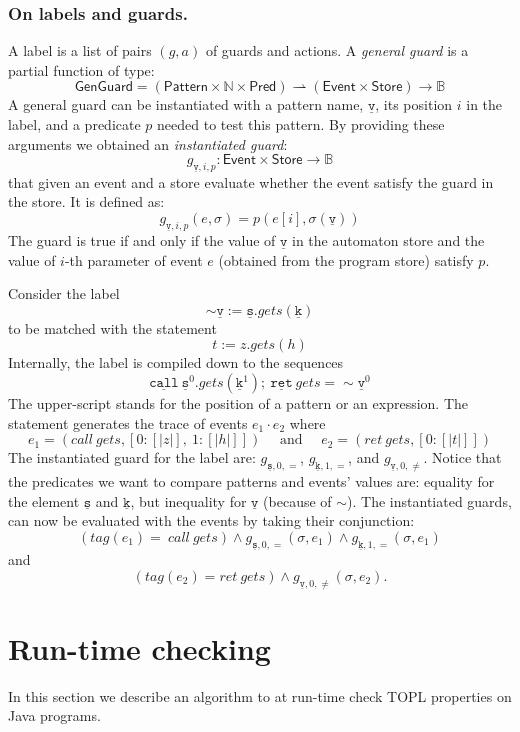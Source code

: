 \documentclass{llncs} %
\newcommand{\B}{\ensuremath{\mathbb{B}}}
\newcommand{\N}{\ensuremath{\mathbb{N}}}
\newcommand{\pattern}[1]{\ensuremath{\mathtt{\underline{#1}}}}
\newcommand{\pmap}{\rightharpoonup}
\newcommand{\set}[1]{\ensuremath{\mathsf{#1}}}
\begin{document}
\subsubsection{On labels and guards.}
 A label is a list of pairs $(g,a)$ of guards and actions. A  {\em general guard} is a partial function of type:
\[
\set{GenGuard} = (\set{Pattern} \times \N \times \set{Pred}) \pmap (\set{Event}\times\set{Store}) \to \B
\]
A general guard can be instantiated with a pattern  name, $\pattern v$,  its position $i$ in the label, and a predicate $p$ needed to test this pattern. By providing these arguments we obtained an {\em instantiated guard}:
\[
g_{\pattern{v},i,p} : \set{Event}\times\set{Store} \to \B
\]
that given an event and a store evaluate whether the event satisfy the guard in the store. It is defined as:
\newcommand{\sem}[1]{[ \! | #1 | \! ]}
\[
g_{\pattern{v},i,p}(e, \sigma) = p(e[i],\sigma(\pattern v))
\] The guard is true if and only if the value of $\pattern{v}$ in the automaton store 
and the value of $i$-th parameter of  event $e$ (obtained from the program store) satisfy $p$.
\begin{example}
Consider the label 
\[
 \sim \pattern {v} := \pattern {s}.gets(\pattern {k})
 \] to be matched with the statement 
\[
 t:=z.gets(h)
\] Internally,  the label is compiled down to the sequences 
\[
\pattern{call} \  \pattern{s}^0 .gets(\pattern {k}^1);  \ \pattern{ret} \ gets = \sim \pattern {v}^0   
\] The upper-script stands for the position of a pattern or an expression. The statement generates the trace of events $e_1 \cdot e_2$ where 
\[ 
 e_1=(call \ gets, [0: \sem{z}, \ 1: \sem{h}])  \quad \mbox{ and }  \quad e_2= (ret \ gets, [0: \sem{t}])
\] 
The instantiated guard for the label are:
 $g_{\pattern{s},0,=}$, $g_{\pattern{k},1,=}$, and  $g_{\pattern{v},0, \neq}$.  
Notice that the predicates we want to compare patterns and events' values are: equality for the element $\pattern{s}$ and $\pattern{k}$, 
but inequality for \pattern{v} (because of $\sim$).
The instantiated guards, can now be evaluated with the events by taking their conjunction:
\[ 
 (tag(e_1)= \ call \ gets) \wedge g_{\pattern{s},0,=}(\sigma,e_1) \wedge g_{\pattern{k},1,=}(\sigma, e_1) 
\] and 
\[ 
 (tag(e_2)= ret \ gets) \wedge g_{\pattern{v},0,\neq}(\sigma,e_2).
\]
\end{example}



\section{Run-time checking}
In this section we describe an algorithm to at run-time check TOPL properties on Java programs.
\end{document}
